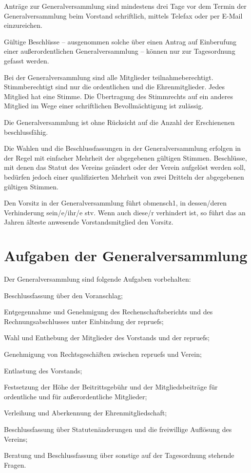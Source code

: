 \documentclass{article}
\begin{document}
\begin{absatz}
    \item Anträge zur Generalversammlung sind mindestens drei Tage vor dem Termin der Generalversammlung beim Vorstand schriftlich, mittels Telefax oder per E-Mail einzureichen.
    \item Gültige Beschlüsse – ausgenommen solche über einen Antrag auf Einberufung einer außerordentlichen Generalversammlung – können nur zur Tagesordnung gefasst werden.
    \item Bei der Generalversammlung sind alle Mitglieder teilnahmeberechtigt. Stimmberechtigt sind nur die ordentlichen und die Ehrenmitglieder. Jedes Mitglied hat eine Stimme. Die Übertragung des Stimmrechts auf ein anderes Mitglied im Wege einer schriftlichen Bevollmächtigung ist zulässig.
    \item Die Generalversammlung ist ohne Rücksicht auf die Anzahl der Erschienenen beschlussfähig.
    \item Die Wahlen und die Beschlussfassungen in der Generalversammlung erfolgen in der Regel mit einfacher Mehrheit der abgegebenen gültigen Stimmen. Beschlüsse, mit denen das Statut des Vereins geändert oder der Verein aufgelöst werden soll, bedürfen jedoch einer qualifizierten Mehrheit von zwei Dritteln der abgegebenen gültigen Stimmen.
    \item Den Vorsitz in der Generalversammlung führt \gls{obmensch1}, in dessen/deren Verhinderung sein/e/ihr/e \gls{stv}. Wenn auch diese/r verhindert ist, so führt das an Jahren älteste anwesende Vorstandsmitglied den Vorsitz.
\end{absatz}



\section{Aufgaben der Generalversammlung}\label{generalversammlung-aufgaben}
Der Generalversammlung sind folgende Aufgaben vorbehalten:
\begin{littera}
    \item Beschlussfassung über den Voranschlag;
    \item Entgegennahme und Genehmigung des Rechenschaftsberichts und des Rechnungsabschlusses unter Einbindung der \glspl{repruef};
    \item Wahl und Enthebung der Mitglieder des Vorstands und der \glspl{repruef};
    \item Genehmigung von Rechtsgeschäften zwischen \glspl{repruef} und Verein;
    \item Entlastung des Vorstands;
    \item Festsetzung der Höhe der Beitrittsgebühr und der Mitgliedsbeiträge für ordentliche und für außerordentliche Mitglieder;
    \item Verleihung und Aberkennung der Ehrenmitgliedschaft;
    \item Beschlussfassung über Statutenänderungen und die freiwillige Auflösung des Vereins;
    \item Beratung und Beschlussfassung über sonstige auf der Tagesordnung stehende Fragen.
\end{littera}
\end{document}
